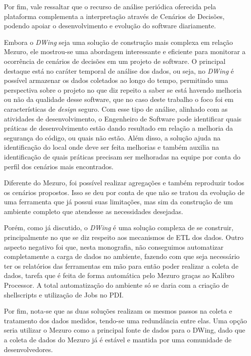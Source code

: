 Por fim, vale ressaltar que o recurso de análise periódica oferecida pela plataforma complementa a interpretação através de Cenários de Decisões, podendo apoiar o desenvolvimento e evolução do software diariamente.

Embora o \emph{DWing} seja uma solução de construção mais complexa em relação Mezuro, ele mostrou-se uma abordagem interessante e eficiente para monitorar a ocorrência de cenários de decisões em um projeto de software. O principal destaque está no caráter temporal de análise dos dados, ou seja, no \emph{DWing} é possível armazenar os dados coletados ao longo do tempo, permitindo uma perspectiva sobre o projeto no que diz repeito a saber se está havendo melhoria ou não da qualidade desse software, que no caso deste trabalho o foco foi em características de \emph{design} seguro. Com esse tipo de análise, alinhado com as atividades de desenvolvimento, o Engenheiro de Software pode identificar quais práticas de desenvolvimento estão dando resultado em relação a melhoria da segurança do código, ou quais não estão. Além disso, a solução ajuda na identificação do local onde deve ser feita melhorias e também auxilia na identificação de quais práticas precisam ser melhoradas na equipe por conta do perfil dos cenários mais encontrados.

Diferente do Mezuro, foi possível realizar agregações e também reproduzir todos os cenários propostos. Isso se deu por conta de que não se tratou da evolução de uma ferramenta que já possui suas limitações, mas sim da construção de um ambiente completo que atendesse as necessidades desejadas.

Porém, como já discutido, o \emph{DWing} é uma solução complexa de se construir, principalmente no que se diz respeito aos  mecanismos de ETL dos dados. Outro aspecto negativo foi que, nesta monografia, não conseguimos automatizar completamente a carga de dados no ambiente, fazendo com que seja necessário ter os relatórios das ferramentas em mão para então poder realizar a coleta de dados, tarefa que é feita de forma automática pelo Mezuro graças ao Kalibro Processor. A total automatização do ambiente só se daria com a criação de shellscripts e utilização de Jobs no PDI.


Por fim, nota-se que as duas soluções realizam os mesmos passos na coleta e tratamento dos dados medidos, tendo-se uma redundância entre elas. Uma opção seria utilizar o Mezuro como a principal fonte de dados para o DWing, dado que a coleta de dados do Mezuro já é estável e mantida por uma comunidade de desenvolvedores.